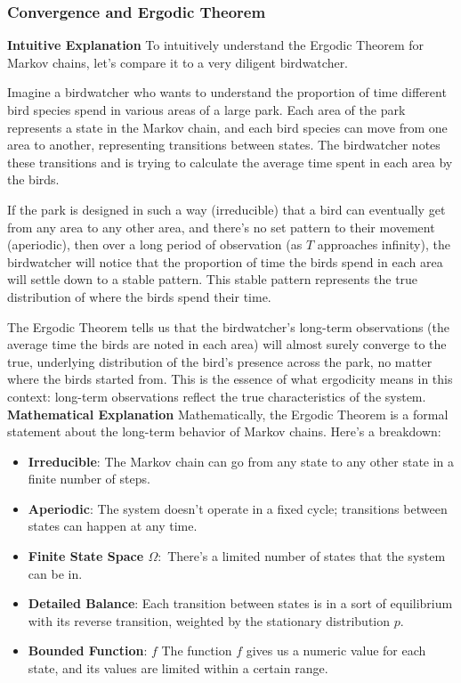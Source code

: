 \documentclass{article}
\begin{document}
\subsubsection{Convergence and Ergodic Theorem}
\textbf{Intuitive Explanation}
\newline
To intuitively understand the Ergodic Theorem for Markov chains, let's compare it to a very diligent birdwatcher.

Imagine a birdwatcher who wants to understand the proportion of time different bird species spend in various areas of a large park. Each area of the park represents a state in the Markov chain, and each bird species can move from one area to another, representing transitions between states. The birdwatcher notes these transitions and is trying to calculate the average time spent in each area by the birds.

If the park is designed in such a way (irreducible) that a bird can eventually get from any area to any other area, and there's no set pattern to their movement (aperiodic), then over a long period of observation (as \( T \) approaches infinity), the birdwatcher will notice that the proportion of time the birds spend in each area will settle down to a stable pattern. This stable pattern represents the true distribution of where the birds spend their time.

The Ergodic Theorem tells us that the birdwatcher's long-term observations (the average time the birds are noted in each area) will almost surely converge to the true, underlying distribution of the bird's presence across the park, no matter where the birds started from. This is the essence of what ergodicity means in this context: long-term observations reflect the true characteristics of the system.
\newline
\textbf{Mathematical Explanation}
\newline
Mathematically, the Ergodic Theorem is a formal statement about the long-term behavior of Markov chains. Here's a breakdown:
\begin{itemize}
    \item \textbf{Irreducible}: The Markov chain can go from any state to any other state in a finite number of steps.
    \item \textbf{Aperiodic}: The system doesn't operate in a fixed cycle; transitions between states can happen at any time.
    \item \textbf{Finite State Space \( \Omega :\)} There's a limited number of states that the system can be in.
    \item \textbf{Detailed Balance}: Each transition between states is in a sort of equilibrium with its reverse transition, weighted by the stationary distribution \( p \).
    \item \textbf{Bounded Function}: \( f \) The function \( f \) gives us a numeric value for each state, and its values are limited within a certain range.
\end{itemize}
\end{document}
